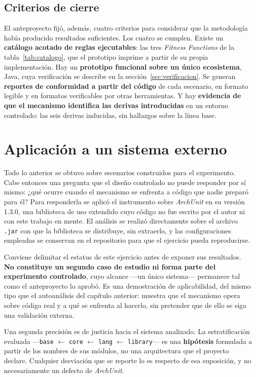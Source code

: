 \subsection{Criterios de cierre}
El anteproyecto fijó, además, cuatro criterios para considerar que la metodología había producido resultados suficientes. Los cuatro se cumplen. Existe un \textbf{catálogo acotado de reglas ejecutables}: las tres \textit{Fitness Functions} de la tabla~\ref{tab:catalogo}, que el prototipo imprime a partir de su propia implementación. Hay un \textbf{prototipo funcional sobre un único ecosistema}, Java, cuya verificación se describe en la sección~\ref{sec:verificacion}. Se generan \textbf{reportes de conformidad a partir del código} de cada escenario, en formato legible y en formatos verificables por otras herramientas. Y hay \textbf{evidencia de que el mecanismo identifica las derivas introducidas} en un entorno controlado: las seis derivas inducidas, sin hallazgos sobre la línea base.

\section{Aplicación a un sistema externo}
\label{sec:archunit}
Todo lo anterior se obtuvo sobre escenarios construidos para el experimento. Cabe entonces una pregunta que el diseño controlado no puede responder por sí mismo: ¿qué ocurre cuando el mecanismo se enfrenta a código que nadie preparó para él? Para responderla se aplicó el instrumento sobre \textit{ArchUnit} en su versión 1.3.0, una biblioteca de uso extendido cuyo código no fue escrito por el autor ni con este trabajo en mente. El análisis se realizó directamente sobre el archivo \texttt{.jar} con que la biblioteca se distribuye, sin extraerlo, y las configuraciones empleadas se conservan en el repositorio para que el ejercicio pueda reproducirse.

Conviene delimitar el estatus de este ejercicio antes de exponer sus resultados. \textbf{No constituye un segundo caso de estudio ni forma parte del experimento controlado}, cuyo alcance ---un único sistema--- permanece tal como el anteproyecto lo aprobó. Es una demostración de aplicabilidad, del mismo tipo que el autoanálisis del capítulo anterior: muestra que el mecanismo opera sobre código real y a qué se enfrenta al hacerlo, sin pretender que de ello se siga una validación externa.

Una segunda precisión es de justicia hacia el sistema analizado. La estratificación evaluada ---\texttt{base} $\leftarrow$ \texttt{core} $\leftarrow$ \texttt{lang} $\leftarrow$ \texttt{library}--- es una \textbf{hipótesis} formulada a partir de los nombres de sus módulos, no una arquitectura que el proyecto declare. Cualquier desviación que se reporte lo es respecto de esa suposición, y no necesariamente un defecto de \textit{ArchUnit}.

